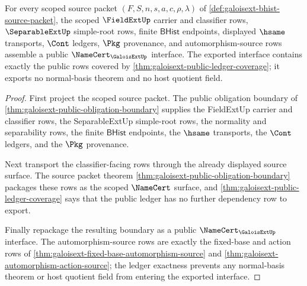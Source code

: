 \begin{theorem}
\label{thm:galoisext-public-interface-export}
For every scoped source packet $(F,S,n,s,a,c,\rho,\lambda)$ of
\autoref{def:galoisext-bhist-source-packet}, the scoped $\FieldExtUp$ carrier
and classifier rows, $\SeparableExtUp$ simple-root rows, finite
$\mathsf{BHist}$ endpoints, displayed $\hsame$ transports, $\Cont$ ledgers,
$\Pkg$ provenance, and automorphism-source rows assemble a public
$\NameCert_{\GaloisExtUp}$ interface. The exported interface contains exactly
the public rows covered by
\autoref{thm:galoisext-public-ledger-coverage}; it exports no normal-basis
theorem and no host quotient field.
\end{theorem}
\begin{proof}
First project the scoped source packet. The public obligation boundary of
\autoref{thm:galoisext-public-obligation-boundary} supplies the FieldExtUp
carrier and classifier rows, the SeparableExtUp simple-root rows, the
normality and separability rows, the finite $\mathsf{BHist}$ endpoints, the
$\hsame$ transports, the $\Cont$ ledgers, and the $\Pkg$ provenance.

Next transport the classifier-facing rows through the already displayed source
surface. The source packet theorem
\autoref{thm:galoisext-public-obligation-boundary} packages these
rows as the scoped $\NameCert$ surface, and
\autoref{thm:galoisext-public-ledger-coverage} says that the public ledger has
no further dependency row to export.

Finally repackage the resulting boundary as a public
$\NameCert_{\GaloisExtUp}$ interface. The automorphism-source rows are exactly
the fixed-base and action rows of
\autoref{thm:galoisext-fixed-base-automorphism-source} and
\autoref{thm:galoisext-automorphism-action-source}; the ledger exactness
prevents any normal-basis theorem or host quotient field from entering the
exported interface.
\end{proof}

